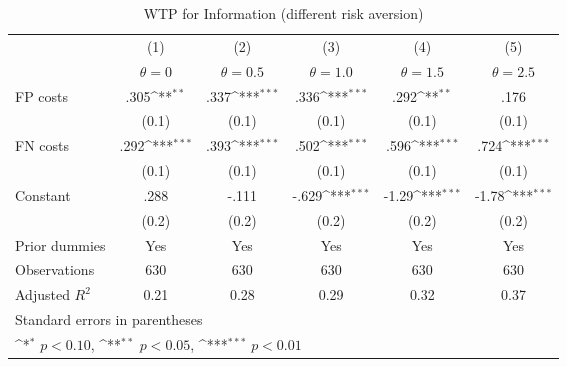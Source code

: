 \begin{table}[htbp]\centering
\def\sym#1{\ifmmode^{#1}\else\(^{#1}\)\fi}
\caption{WTP for Information (different risk aversion)}
\begin{tabular}{l*{5}{c}}
\hline\hline
                &\multicolumn{1}{c}{(1)}&\multicolumn{1}{c}{(2)}&\multicolumn{1}{c}{(3)}&\multicolumn{1}{c}{(4)}&\multicolumn{1}{c}{(5)}\\
                &\multicolumn{1}{c}{$\theta=0$}&\multicolumn{1}{c}{$\theta=0.5$}&\multicolumn{1}{c}{$\theta=1.0$}&\multicolumn{1}{c}{$\theta=1.5$}&\multicolumn{1}{c}{$\theta=2.5$}\\
\hline
FP costs        &     .305\sym{**} &     .337\sym{***}&     .336\sym{***}&     .292\sym{**} &     .176         \\
                &    (0.1)         &    (0.1)         &    (0.1)         &    (0.1)         &    (0.1)         \\
FN costs        &     .292\sym{***}&     .393\sym{***}&     .502\sym{***}&     .596\sym{***}&     .724\sym{***}\\
                &    (0.1)         &    (0.1)         &    (0.1)         &    (0.1)         &    (0.1)         \\
Constant        &     .288         &    -.111         &    -.629\sym{***}&    -1.29\sym{***}&    -1.78\sym{***}\\
                &    (0.2)         &    (0.2)         &    (0.2)         &    (0.2)         &    (0.2)         \\
Prior dummies   &      Yes         &      Yes         &      Yes         &      Yes         &      Yes         \\
\hline
Observations    &      630         &      630         &      630         &      630         &      630         \\
Adjusted \(R^{2}\)&     0.21         &     0.28         &     0.29         &     0.32         &     0.37         \\
\hline\hline
\multicolumn{6}{l}{\footnotesize Standard errors in parentheses}\\
\multicolumn{6}{l}{\footnotesize \sym{*} \(p<0.10\), \sym{**} \(p<0.05\), \sym{***} \(p<0.01\)}\\
\end{tabular}
\end{table}
